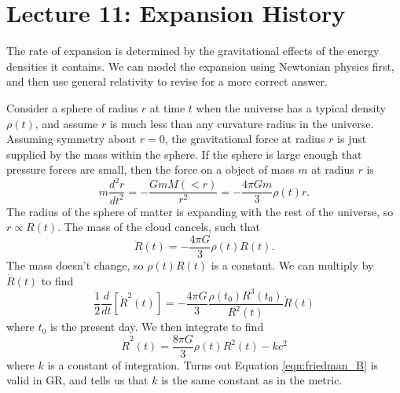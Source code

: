 \documentclass[]{article}
\begin{document}
\section{Lecture 11: Expansion History}

The rate of expansion is determined by the gravitational effects
of the energy densities it contains.  We can model the expansion
using Newtonian physics first, and then use general relativity
to revise for a more correct answer.

Consider a sphere of radius $r$ at time $t$ when the 
universe has a typical density $\rho(t)$, and assume
$r$ is much less than any curvature radius in the 
universe.  Assuming symmetry about $r=0$, the
gravitational force at radius $r$ is just supplied by the
mass within the sphere.  If the sphere
is large enough that pressure forces are small, then
the force on a object of mass $m$ at radius $r$ is
\begin{equation}
m \frac{d^2 r}{dt^2} = - \frac{G m M(<r)}{r^2} = - \frac{4\pi Gm}{3}\rho(t)r.
\end{equation}
\noindent
The radius of the sphere of matter is expanding with the
rest of the universe, so $r\propto R(t)$.  The mass of the
cloud cancels, such that
\begin{equation}
\label{eqn:friedman_A}
\ddot{R}(t) = - \frac{4\pi G}{3} \rho(t) R(t).
\end{equation}
\noindent
The mass doesn't change, so $\rho(t) R(t)$ is a constant.
We can multiply by $\dot{R}(t)$ to find
\begin{equation}
\frac{1}{2} \frac{d}{dt}[\dot{R}^2(t)] = - \frac{4 \pi G}{3} \frac{\rho(t_0)R^3(t_0)}{R^2(t)} \dot{R}(t)
\end{equation}
\noindent
where $t_0$ is the present day.  We then integrate to find
\begin{equation}
\label{eqn:friedman_B}
\dot{R}^2(t) = \frac{8\pi G}{3}\rho(t) R^2(t) - kc^2
\end{equation}
\noindent
where $k$ is a constant of integration.  Turns out Equation
\ref{eqn:friedman_B} is valid in GR, and tells us
that $k$ is the same constant as in the metric.
\end{document}
